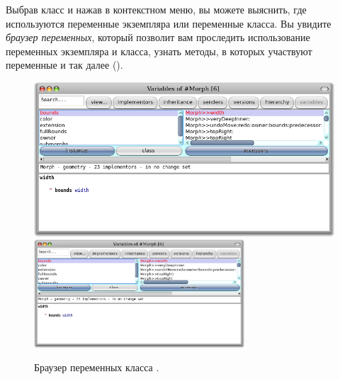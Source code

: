 \documentclass[a4paper,10pt,twoside]{book}
\begin{document}

Выбрав класс и нажав  в контекстном меню, вы можете выяснить, где используются переменные экземпляра или переменные класса. Вы увидите \emph{браузер переменных}, который позволит вам проследить использование переменных экземпляра и класса, узнать методы, в которых участвуют переменные и так далее ().

\begin{figure}[btp]
	\begin{center}
	\ifluluelse
		{\includegraphics[width=\textwidth]{chasingBrowser}}
		{\includegraphics[width=0.7\textwidth]{chasingBrowser}}
	\end{center}
	\caption{Браузер переменных класса .}
\end{figure}

\end{document}

